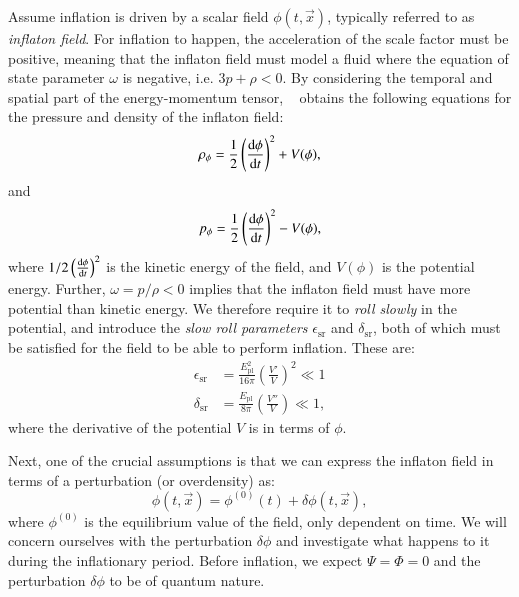     Assume inflation is driven by a scalar field $\phi(t,\vec{x})$, typically referred to as \textit{inflaton field}. For inflation to happen, the acceleration of the scale factor must be positive, meaning that the inflaton field must model a fluid where the equation of state parameter $\omega$ is negative, i.e. $3p+\rho<0$. By considering the temporal and spatial part of the energy-momentum tensor, ~\cite{dodelson2020modern} obtains the following equations for the pressure and density of the inflaton field:
    \begin{equation}\label{eq:m3:theory:inflaton_density}
        \rho_\phi = \frac{1}{2}\left(\dv{\phi}{t}\right)^2+V(\phi),
    \end{equation}
    and 
    \begin{equation}\label{eq:m3:theory:inflaton_pressure}
        p_\phi = \frac{1}{2}\left(\dv{\phi}{t}\right)^2-V(\phi),
    \end{equation}
    where $1/2\left(\dv{\phi}{t}\right)^2$ is the kinetic energy of the field, and $V(\phi)$ is the potential energy. Further, $\omega = p/\rho < 0$ implies that the inflaton field must have more potential than kinetic energy. We therefore require it to \textit{roll slowly} in the potential, and introduce the \textit{slow roll parameters} $\epsilon_\mathrm{sr}$ and $\delta_\mathrm{sr}$, both of which must be satisfied for the field to be able to perform inflation. These are:
    \begin{subequations}\label{eq:m3:theory:slow_roll_parameters}
        \begin{align}
            \epsilon_\mathrm{sr} &= \frac{E_\mathrm{pl}^2}{16\pi}\left(\frac{V'}{V}\right)^2 \ll1 \label{eq:m3:theory:slow_roll_epsilon}\\
            \delta_\mathrm{sr} &= \frac{E_\mathrm{pl}}{8\pi}\left( \frac{V''}{V}\right) \ll1,\label{eq:m3:theory:slow_roll_delta}
        \end{align}
    \end{subequations}
    where the derivative of the potential $V$ is in terms of $\phi$. 

    Next, one of the crucial assumptions is that we can express the inflaton field in terms of a perturbation (or overdensity) as:
    \begin{equation}\label{eq:m3:theory:inflaton_field_perturb}
        \phi(t,\vec{x}) = \phi^{(0)}(t) + \delta\phi(t, \vec{x}),
    \end{equation}
    where $\phi^{(0)}$ is the equilibrium value of the field, only dependent on time. We will concern ourselves with the perturbation $\delta\phi$ and investigate what happens to it during the inflationary period. Before inflation, we expect $\Psi = \Phi =0$ and the perturbation $\delta\phi$ to be of quantum nature. 

